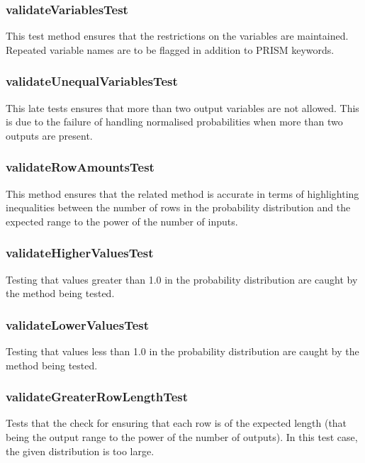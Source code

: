\documentclass[report.tex]{subfiles}
\begin{document}
\subsubsection{validateVariablesTest} %
\label{ssub:validatevariablestest}
This test method ensures that the restrictions on the variables are maintained.
Repeated variable names are to be flagged in addition to PRISM keywords.

\subsubsection{validateUnequalVariablesTest} %
\label{ssub:validateunequalvariablestest}
This late tests ensures that more than two output variables are not allowed.
This is due to the failure of handling normalised probabilities when more than
two outputs are present.

\subsubsection{validateRowAmountsTest} %
\label{ssub:validaterowamountstest}
This method ensures that the related method is accurate in terms of highlighting
inequalities between the number of rows in the probability distribution and the
expected range to the power of the number of inputs.

\subsubsection{validateHigherValuesTest} %
\label{ssub:validatehighervaluestest}
Testing that values greater than 1.0 in the probability distribution are caught
by the method being tested.

\subsubsection{validateLowerValuesTest} %
\label{ssub:validatelowervaluestest}
Testing that values less than 1.0 in the probability distribution are caught
by the method being tested.
\newpage

\subsubsection{validateGreaterRowLengthTest} %
\label{ssub:validategreaterrowlengthtest}
Tests that the check for ensuring that each row is of the expected length (that
being the output range to the power of the number of outputs). In this test
case, the given distribution is too large.
\end{document}
